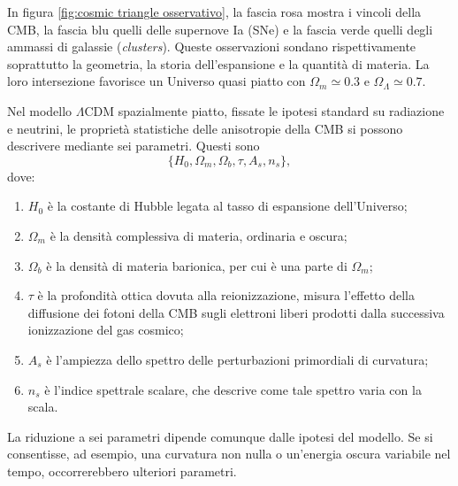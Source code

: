 In figura \ref{fig:cosmic triangle osservativo}, la fascia rosa mostra i vincoli della CMB, la fascia blu quelli delle supernove Ia (SNe) e la fascia verde quelli degli ammassi di galassie (\emph{clusters}). Queste osservazioni sondano rispettivamente soprattutto la geometria, la storia dell'espansione e la quantità di materia. La loro intersezione favorisce un Universo quasi piatto con $\Omega_m \simeq 0.3$ e $\Omega_\Lambda \simeq 0.7$.

Nel modello $\Lambda$CDM spazialmente piatto, fissate le ipotesi standard
su radiazione e neutrini, le proprietà statistiche delle anisotropie
della CMB si possono descrivere mediante sei parametri. Questi sono
\begin{equation}
    \{H_0,\Omega_m,\Omega_b,\tau,A_s,n_s\},
\end{equation}
dove:
\begin{enumerate}
    \item $H_0$ è la costante di Hubble legata al tasso di espansione dell'Universo;
    \item $\Omega_m$ è la densità complessiva di materia,
    ordinaria e oscura;
    \item $\Omega_b$ è la densità di materia barionica, per cui è una parte di $\Omega_m$;
    \item $\tau$ è la profondità ottica dovuta alla reionizzazione, 
    misura l'effetto della diffusione dei fotoni della CMB
    sugli elettroni liberi prodotti dalla successiva ionizzazione
    del gas cosmico;
    \item $A_s$ è l'ampiezza dello spettro delle perturbazioni
    primordiali di curvatura;
    \item $n_s$ è l'indice spettrale scalare, che descrive come tale
    spettro varia con la scala.
\end{enumerate}
La riduzione a sei parametri dipende comunque dalle ipotesi del modello. Se si consentisse, ad esempio, una curvatura non nulla o un'energia oscura
variabile nel tempo, occorrerebbero ulteriori parametri.